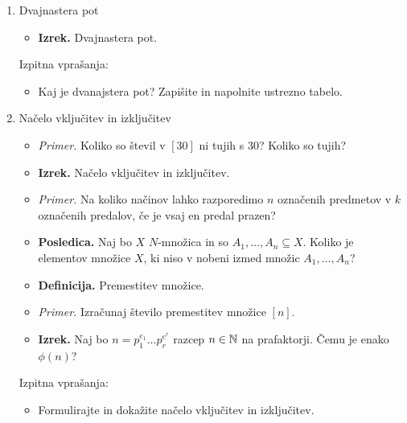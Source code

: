 \begin{enumerate}
    \item Dvajnastera pot
    \begin{itemize}
        \item \colorbox{blue!30}{\textbf{Izrek.}} Dvajnastera pot.
    \end{itemize}

    Izpitna vprašanja:
    \begin{itemize}
        \item Kaj je dvanajstera pot? Zapišite in napolnite ustrezno tabelo.
    \end{itemize}

    \item Načelo vključitev in izključitev
    \begin{itemize}
        \item \colorbox{yellow!30}{\emph{Primer.}} Koliko so števil v \([30]\) ni tujih s \(30\)? Koliko so tujih?
        \item \colorbox{blue!30}{\textbf{Izrek.}} Načelo vključitev in izključitev.
        \item \colorbox{yellow!30}{\emph{Primer.}} Na koliko načinov lahko razporedimo $n$ označenih predmetov v $k$ označenih predalov, če je vsaj en predal prazen?
        \item \colorbox{orange!30}{\textbf{Posledica.}} Naj bo \(X\) \(N\)-množica in so \(A_1, \ldots, A_n \subseteq X\). Koliko je elementov množice \(X\), ki niso v nobeni izmed množic \(A_1, \ldots, A_n\)?
        \item \colorbox{purple!30}{\textbf{Definicija.}} Premestitev množice.
        \item \colorbox{yellow!30}{\emph{Primer.}} Izračunaj število premestitev množice \([n]\).
        \item \colorbox{blue!30}{\textbf{Izrek.}} Naj bo $n = p_1^{e_1} \ldots p_r^{e^r}$ razcep $n \in \mathbb{N}$ na prafaktorji. Čemu je enako \(\phi(n)\)?
    \end{itemize}

    Izpitna vprašanja:
    \begin{itemize}
        \item Formulirajte in dokažite načelo vključitev in izključitev.
    \end{itemize}


\end{enumerate}
